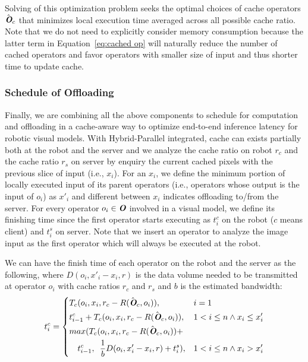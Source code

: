 Solving of this optimization problem seeks the optimal choices of cache operators $\hat{\textit{\textbf{O}}}_c$ that minimizes local execution time averaged across all possible cache ratio.
Note that we do not need to explicitly consider memory consumption because the latter term in Equation~\ref{eq:cached op} will naturally reduce the number of cached operators and favor operators with smaller size of input and thus shorter time to update cache.

\subsubsection{Schedule of Offloading\label{sec:schedule}}
Finally, we are combining all the above components to schedule for computation and offloading in a cache-aware way to optimize end-to-end inference latency for robotic visual models.
With Hybrid-Parallel integrated, cache can exists partially both at the robot and the server and we analyze the cache ratio on robot $r_c$ and the cache ratio $r_s$ on server by enquiry the current cached pixels with the previous slice of input (i.e., $x_i$).
For an $x_i$, we define the minimum portion of locally executed input of its parent operators (i.e., operators whose output is the input of $o_i$) as $x'_i$ and different between $x_i$ indicates offloading to/from the server.
For every operator $o_i \in \textit{\textbf{O}}$ involved in a visual model, we define its finishing time since the first operator starts executing as $t_i^{c}$ on the robot ($c$ means client) and $t_i^{s}$ on server.
Note that we insert an operator to analyze the image input as the first operator which will always be executed at the robot.

We can have the finish time of each operator on the robot and the server as the following, where $D(o_i, x'_i-x_i,r)$ is the data volume needed to be transmitted at operator $o_i$ with cache ratios $r_c$ and $r_s$ and $b$ is the estimated bandwidth:
\begin{equation}
    t_i^{c} = \left\{
        \begin{aligned}
            &T_c(o_i, x_i, r_c-R(\hat{\textit{\textbf{O}}}_c, o_i)),&&i=1\\
            &t_{i-1}^{c} + T_c(o_i, x_i, r_c-R(\hat{\textit{\textbf{O}}}_c, o_i)),&&1<i\le n \land x_i\le x'_i \\
            &max(T_c(o_i, x_i, r_c-R(\hat{\textit{\textbf{O}}}_c, o_i)) +\\
            & \enspace \enspace t_{i-1}^{c}, \enspace \frac{1}{b}D(o_i, x'_i-x_i,r)+ t_i^{s}),&&1<i\le n \land x_i >x'_i
        \end{aligned}
    \right.
    \label{eq:robot}
\end{equation}

